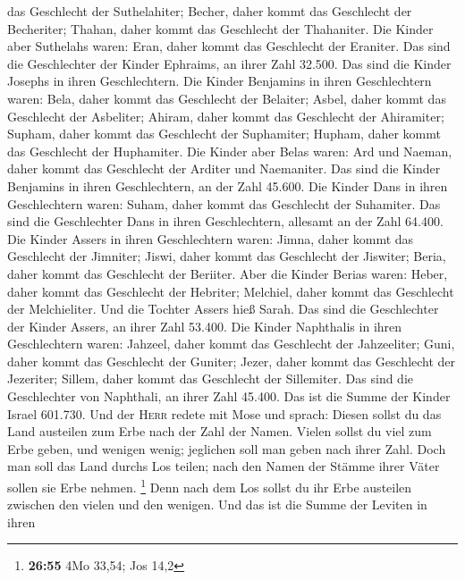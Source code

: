 das Geschlecht der Suthelahiter; Becher, daher kommt das Geschlecht der
Becheriter; Thahan, daher kommt das Geschlecht der Thahaniter.
 Die Kinder aber Suthelahs waren: Eran, daher kommt das
Geschlecht der Eraniter.  Das sind die Geschlechter der
Kinder Ephraims, an ihrer Zahl 32.500. Das sind die Kinder Josephs in
ihren Geschlechtern.  Die Kinder Benjamins in ihren
Geschlechtern waren: Bela, daher kommt das Geschlecht der Belaiter;
Asbel, daher kommt das Geschlecht der Asbeliter; Ahiram, daher kommt das
Geschlecht der Ahiramiter;  Supham, daher kommt das
Geschlecht der Suphamiter; Hupham, daher kommt das Geschlecht der
Huphamiter.  Die Kinder aber Belas waren: Ard und Naeman,
daher kommt das Geschlecht der Arditer und Naemaniter. 
Das sind die Kinder Benjamins in ihren Geschlechtern, an der Zahl
45.600.  Die Kinder Dans in ihren Geschlechtern waren:
Suham, daher kommt das Geschlecht der Suhamiter.  Das
sind die Geschlechter Dans in ihren Geschlechtern, allesamt an der Zahl
64.400.  Die Kinder Assers in ihren Geschlechtern waren:
Jimna, daher kommt das Geschlecht der Jimniter; Jiswi, daher kommt das
Geschlecht der Jiswiter; Beria, daher kommt das Geschlecht der Beriiter.
 Aber die Kinder Berias waren: Heber, daher kommt das
Geschlecht der Hebriter; Melchiel, daher kommt das Geschlecht der
Melchieliter.  Und die Tochter Assers hieß Sarah.
 Das sind die Geschlechter der Kinder Assers, an ihrer
Zahl 53.400.  Die Kinder Naphthalis in ihren
Geschlechtern waren: Jahzeel, daher kommt das Geschlecht der
Jahzeeliter; Guni, daher kommt das Geschlecht der Guniter;
 Jezer, daher kommt das Geschlecht der Jezeriter; Sillem,
daher kommt das Geschlecht der Sillemiter.  Das sind die
Geschlechter von Naphthali, an ihrer Zahl 45.400.  Das
ist die Summe der Kinder Israel 601.730.  Und der
\textsc{Herr} redete mit Mose und sprach:  Diesen sollst
du das Land austeilen zum Erbe nach der Zahl der Namen. 
Vielen sollst du viel zum Erbe geben, und wenigen wenig; jeglichen soll
man geben nach ihrer Zahl.  Doch man soll das Land durchs
Los teilen; nach den Namen der Stämme ihrer Väter sollen sie Erbe
nehmen. \footnote{\textbf{26:55} 4Mo 33,54; Jos 14,2} 
Denn nach dem Los sollst du ihr Erbe austeilen zwischen den vielen und
den wenigen.  Und das ist die Summe der Leviten in ihren
